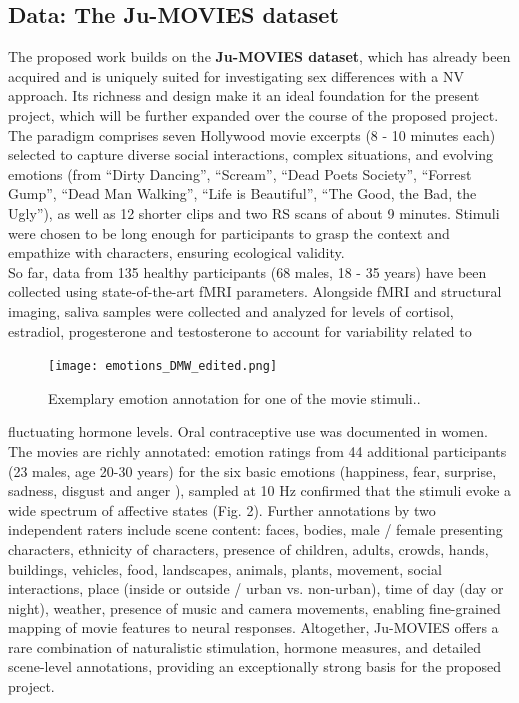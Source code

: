 \documentclass[11pt,a4paper]{article}
\begin{document}
\subsection*{Data: The Ju-MOVIES dataset}
The proposed work builds on the \textbf{Ju-MOVIES dataset}, which has already been acquired and is 
uniquely suited for investigating sex differences with a NV approach. Its richness and design make it an ideal 
foundation for the present project, which will be further expanded over the course of the proposed project. 
The paradigm comprises seven Hollywood movie excerpts (8 - 10 minutes each) selected to capture diverse social 
interactions, complex situations, and evolving emotions (from “Dirty Dancing”, “Scream”, “Dead Poets Society”, “Forrest Gump”, 
“Dead Man Walking”, “Life is Beautiful”, “The Good, the Bad, the Ugly”), as well as 12 shorter clips and two 
RS scans of about 9 minutes.
Stimuli were chosen to be long enough for participants to grasp the context and empathize with characters, 
ensuring ecological validity.\\
So far, data from 135 healthy participants (68 males, 18 - 35 years) have been collected using state-of-the-art fMRI parameters. 
Alongside fMRI and structural imaging, saliva samples were collected and analyzed for levels of cortisol, estradiol, progesterone 
and testosterone to account for variability related to
\begin{figure} %
  \vspace{-10pt} %
  \texttt{[image: emotions\_DMW\_edited.png]}
  \caption{Exemplary emotion annotation for one of the movie stimuli..}
  \label{fig:dmw}
\end{figure}
fluctuating hormone levels. 
Oral contraceptive use was documented in women.\\
The movies are richly annotated: 
emotion ratings from 44 additional participants (23 males, age 20-30 years)
for the six basic emotions (happiness, fear, surprise, sadness, disgust and anger \parencite{ekmanConstantsCulturesFace1971a}), 
sampled at 10 Hz confirmed that the stimuli evoke a wide spectrum of affective states (Fig. 2). 
Further annotations by two independent raters include scene content: faces, bodies, male / female presenting characters, ethnicity of characters, presence of children, 
adults, crowds, hands, buildings, vehicles, food, landscapes, animals, plants, movement, social interactions, 
place (inside or outside / urban vs. non-urban), time of day (day or night), weather, presence of music and 
camera movements, enabling fine-grained mapping of movie features to neural responses.
Altogether, Ju-MOVIES offers a rare combination of naturalistic stimulation, hormone measures, 
and detailed scene-level annotations, providing an exceptionally strong basis for the proposed project.
\end{document}
